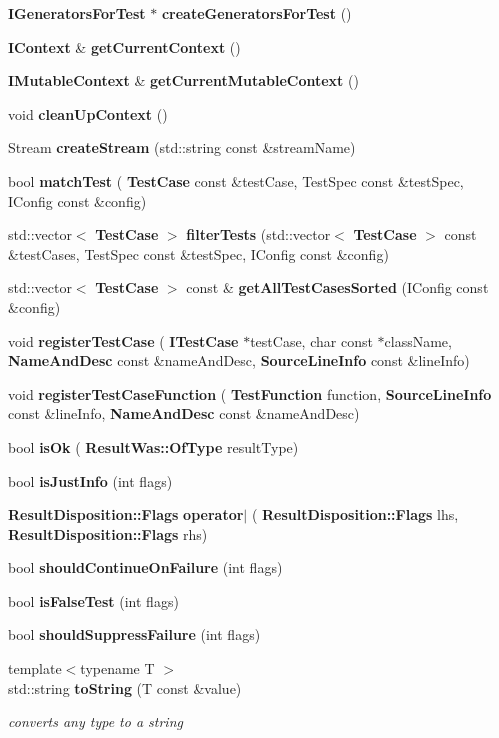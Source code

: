 \begin{DoxyCompactItemize}
\item 
\textbf{ I\+Generators\+For\+Test} $\ast$ \textbf{ create\+Generators\+For\+Test} ()
\item 
\textbf{ I\+Context} \& \textbf{ get\+Current\+Context} ()
\item 
\textbf{ I\+Mutable\+Context} \& \textbf{ get\+Current\+Mutable\+Context} ()
\item 
void \textbf{ clean\+Up\+Context} ()
\item 
Stream \textbf{ create\+Stream} (std\+::string const \&stream\+Name)
\item 
bool \textbf{ match\+Test} (\textbf{ Test\+Case} const \&test\+Case, Test\+Spec const \&test\+Spec, I\+Config const \&config)
\item 
std\+::vector$<$ \textbf{ Test\+Case} $>$ \textbf{ filter\+Tests} (std\+::vector$<$ \textbf{ Test\+Case} $>$ const \&test\+Cases, Test\+Spec const \&test\+Spec, I\+Config const \&config)
\item 
std\+::vector$<$ \textbf{ Test\+Case} $>$ const  \& \textbf{ get\+All\+Test\+Cases\+Sorted} (I\+Config const \&config)
\item 
void \textbf{ register\+Test\+Case} (\textbf{ I\+Test\+Case} $\ast$test\+Case, char const $\ast$class\+Name, \textbf{ Name\+And\+Desc} const \&name\+And\+Desc, \textbf{ Source\+Line\+Info} const \&line\+Info)
\item 
void \textbf{ register\+Test\+Case\+Function} (\textbf{ Test\+Function} function, \textbf{ Source\+Line\+Info} const \&line\+Info, \textbf{ Name\+And\+Desc} const \&name\+And\+Desc)
\item 
bool \textbf{ is\+Ok} (\textbf{ Result\+Was\+::\+Of\+Type} result\+Type)
\item 
bool \textbf{ is\+Just\+Info} (int flags)
\item 
\textbf{ Result\+Disposition\+::\+Flags} \textbf{ operator$\vert$} (\textbf{ Result\+Disposition\+::\+Flags} lhs, \textbf{ Result\+Disposition\+::\+Flags} rhs)
\item 
bool \textbf{ should\+Continue\+On\+Failure} (int flags)
\item 
bool \textbf{ is\+False\+Test} (int flags)
\item 
bool \textbf{ should\+Suppress\+Failure} (int flags)
\item 
{\footnotesize template$<$typename T $>$ }\\std\+::string \textbf{ to\+String} (T const  \&value)
\begin{DoxyCompactList}\small\item\em converts any type to a string \end{DoxyCompactList}\item 

\end{DoxyCompactItemize}
